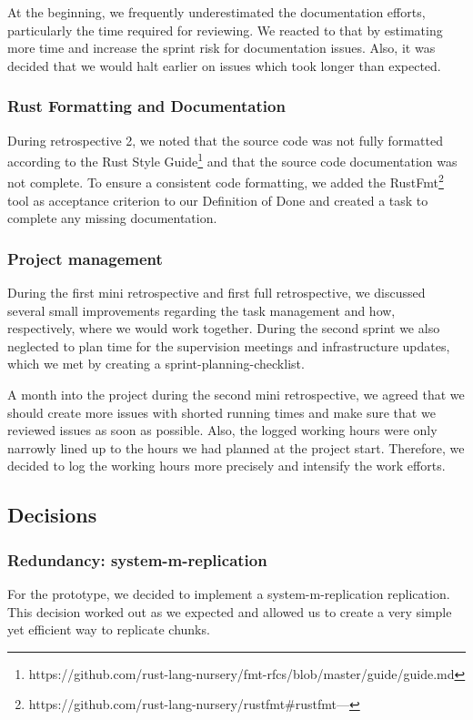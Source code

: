 At the beginning, we frequently underestimated the documentation efforts, particularly the time required for reviewing. We reacted to that by estimating more time and increase the sprint risk for documentation issues. Also, it was decided that we would halt earlier on issues which took longer than expected.

\subsubsection{Rust Formatting and Documentation}
During retrospective 2, we noted that the source code was not fully formatted according to the Rust Style Guide\footnote{https://github.com/rust-lang-nursery/fmt-rfcs/blob/master/guide/guide.md} and that the source code documentation was not complete. To ensure a consistent code formatting, we added the RustFmt\footnote{https://github.com/rust-lang-nursery/rustfmt\#rustfmt---} tool as acceptance criterion to our Definition of Done \cite{project-plan} and created a task to complete any missing documentation.

\subsubsection{Project management}
During the first mini retrospective and first full retrospective, we discussed several small improvements regarding the task management and how, respectively, where we would work together. During the second sprint we also neglected to plan time for the supervision meetings and infrastructure updates, which we met by creating a sprint-planning-checklist.

A month into the project during the second mini retrospective, we agreed that we should create more issues with shorted running times and make sure that we reviewed issues as soon as possible. Also, the logged working hours were only narrowly lined up to the hours we had planned at the project start. Therefore, we decided to log the working hours more precisely and intensify the work efforts.


\subsection{Decisions}
\subsubsection{Redundancy: \gls{system-m-replication}}
For the prototype, we decided to implement a \gls{system-m-replication} replication. This decision worked out as we expected and allowed us to create a very simple yet efficient way to replicate \glspl{chunk}.

